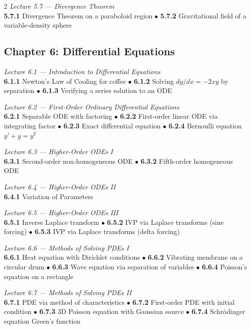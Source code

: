 \begin{multicols}{2}
\medskip
\noindent\textit{Lecture 5.7 --- Divergence Theorem}\\
\textbf{5.7.1} Divergence Theorem on a paraboloid region \(\bullet\)
\textbf{5.7.2} Gravitational field of a variable-density sphere

\subsection*{Chapter 6: Differential Equations}

\noindent\textit{Lecture 6.1 --- Introduction to Differential Equations}\\
\textbf{6.1.1} Newton's Law of Cooling for coffee \(\bullet\)
\textbf{6.1.2} Solving $dy/dx = -2xy$ by separation \(\bullet\)
\textbf{6.1.3} Verifying a series solution to an ODE

\medskip
\noindent\textit{Lecture 6.2 --- First-Order Ordinary Differential Equations}\\
\textbf{6.2.1} Separable ODE with factoring \(\bullet\)
\textbf{6.2.2} First-order linear ODE via integrating factor \(\bullet\)
\textbf{6.2.3} Exact differential equation \(\bullet\)
\textbf{6.2.4} Bernoulli equation $y' + y = y^2$

\medskip
\noindent\textit{Lecture 6.3 --- Higher-Order ODEs I}\\
\textbf{6.3.1} Second-order non-homogeneous ODE \(\bullet\)
\textbf{6.3.2} Fifth-order homogeneous ODE

\medskip
\noindent\textit{Lecture 6.4 --- Higher-Order ODEs II}\\
\textbf{6.4.1} Variation of Parameters

\medskip
\noindent\textit{Lecture 6.5 --- Higher-Order ODEs III}\\
\textbf{6.5.1} Inverse Laplace transform \(\bullet\)
\textbf{6.5.2} IVP via Laplace transforms (sine forcing) \(\bullet\)
\textbf{6.5.3} IVP via Laplace transforms (delta forcing)

\medskip
\noindent\textit{Lecture 6.6 --- Methods of Solving PDEs I}\\
\textbf{6.6.1} Heat equation with Dirichlet conditions \(\bullet\)
\textbf{6.6.2} Vibrating membrane on a circular drum \(\bullet\)
\textbf{6.6.3} Wave equation via separation of variables \(\bullet\)
\textbf{6.6.4} Poisson's equation on a rectangle

\medskip
\noindent\textit{Lecture 6.7 --- Methods of Solving PDEs II}\\
\textbf{6.7.1} PDE via method of characteristics \(\bullet\)
\textbf{6.7.2} First-order PDE with initial condition \(\bullet\)
\textbf{6.7.3} 3D Poisson equation with Gaussian source \(\bullet\)
\textbf{6.7.4} Schr\"odinger equation Green's function


\end{multicols}
